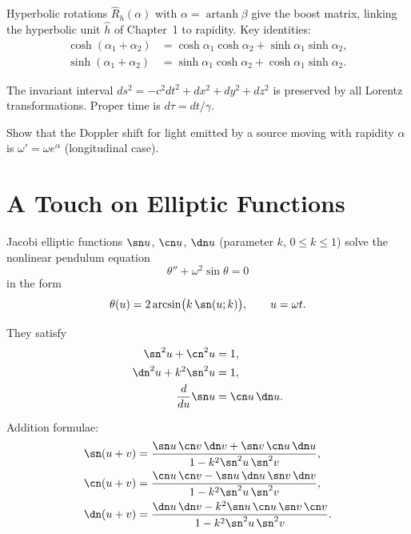 Hyperbolic rotations $\hat R_h(\alpha)$ with $\alpha=\operatorname{artanh}\beta$ give the boost
matrix, linking the hyperbolic unit $\hat h$ of Chapter~1 to rapidity.
Key identities:
\begin{align}
\cosh(\alpha_1+\alpha_2) &= \cosh\alpha_1\cosh\alpha_2 + \sinh\alpha_1\sinh\alpha_2,\\
\sinh(\alpha_1+\alpha_2) &= \sinh\alpha_1\cosh\alpha_2 + \cosh\alpha_1\sinh\alpha_2.
\label{eq:5.5.1}
\end{align}

The invariant interval $ds^2 = -c^2dt^2 + dx^2+dy^2+dz^2$ is preserved by
all Lorentz transformations. Proper time is
$d\tau = dt/\gamma$.

\begin{exercise}
Show that the Doppler shift for light emitted by a source moving with
rapidity $\alpha$ is $\omega'=\omega e^{\alpha}$ (longitudinal case).
\end{exercise}

\section{A Touch on Elliptic Functions}

Jacobi elliptic functions $\sn u$, $\cn u$, $\dn u$ (parameter $k$, $0\le k\le1$)
solve the nonlinear pendulum equation
\begin{equation}
\theta'' + \omega^2\sin\theta = 0
\label{eq:5.6.1}
\end{equation}
in the form
\begin{equation}
\theta(u) = 2\arcsin\bigl(k\,\sn(u;k)\bigr), \qquad u = \omega t.
\label{eq:5.6.2}
\end{equation}

They satisfy
\begin{align}
\sn^2 u + \cn^2 u &= 1,\\
\dn^2 u + k^2\sn^2 u &= 1,\\
\frac{d}{du}\sn u &= \cn u\,\dn u.
\label{eq:5.6.3}
\end{align}

Addition formulae:
\begin{align}
\sn(u+v) &= \frac{\sn u\,\cn v\,\dn v + \sn v\,\cn u\,\dn u}
                  {1-k^2\sn^2 u\,\sn^2 v},\\
\cn(u+v) &= \frac{\cn u\,\cn v - \sn u\,\dn u\,\sn v\,\dn v}
                {1-k^2\sn^2 u\,\sn^2 v},\\
\dn(u+v) &= \frac{\dn u\,\dn v - k^2\sn u\,\cn u\,\sn v\,\cn v}
                {1-k^2\sn^2 u\,\sn^2 v}.
\label{eq:5.6.4}
\end{align}


